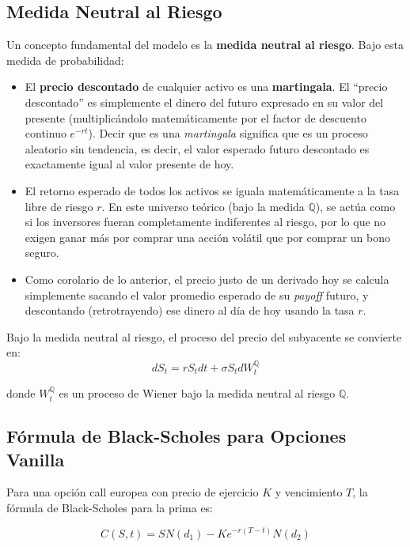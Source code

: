 \subsection{Medida Neutral al Riesgo}

Un concepto fundamental del modelo es la \textbf{medida neutral al riesgo}. Bajo esta medida de probabilidad:

\begin{itemize}
    \item El \textbf{precio descontado} de cualquier activo es una \textbf{martingala}. El ``precio descontado'' es simplemente el dinero del futuro expresado en su valor del presente (multiplicándolo matemáticamente por el factor de descuento continuo $e^{-rt}$). Decir que es una \textit{martingala} significa que es un proceso aleatorio sin tendencia, es decir, el valor esperado futuro descontado es exactamente igual al valor presente de hoy.
    \item El retorno esperado de todos los activos se iguala matemáticamente a la tasa libre de riesgo $r$. En este universo teórico (bajo la medida $\mathbb{Q}$), se actúa como si los inversores fueran completamente indiferentes al riesgo, por lo que no exigen ganar más por comprar una acción volátil que por comprar un bono seguro.
    \item Como corolario de lo anterior, el precio justo de un derivado hoy se calcula simplemente sacando el valor promedio esperado de su \textit{payoff} futuro, y descontando (retrotrayendo) ese dinero al día de hoy usando la tasa $r$.
\end{itemize}

Bajo la medida neutral al riesgo, el proceso del precio del subyacente se convierte en:
\begin{equation}
dS_t = rS_t dt + \sigma S_t dW_t^{\mathbb{Q}}
\end{equation}

donde $W_t^{\mathbb{Q}}$ es un proceso de Wiener bajo la medida neutral al riesgo $\mathbb{Q}$.

\subsection{Fórmula de Black-Scholes para Opciones Vanilla}

Para una opción call europea con precio de ejercicio $K$ y vencimiento $T$, la fórmula de Black-Scholes para la prima es:

\begin{equation}
C(S,t) = S N(d_1) - K e^{-r(T-t)} N(d_2)
\end{equation}

